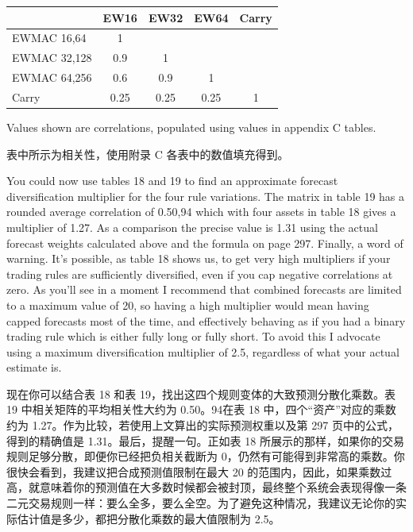 \begin{englishtableblock} \begingroup \small \centering \begin{tabular}{@{} lcccc@{}}
\toprule
& EW16 & EW32 & EW64 & Carry \\
\midrule
EWMAC 16,64 & 1 & & & \\
EWMAC 32,128 & 0.9 & 1 & & \\
EWMAC 64,256 & 0.6 & 0.9 & 1 & \\
Carry & 0.25 & 0.25 & 0.25 & 1 \\
\bottomrule
\end{tabular}
\par \endgroup \end{englishtableblock}

\begin{englishblock} Values shown are correlations, populated using values in appendix C tables. \end{englishblock}

\begin{chineseblock}表中所示为相关性，使用附录 C 各表中的数值填充得到。\end{chineseblock}

\bipairgap

\begin{englishblock} You could now use tables 18 and 19 to find an approximate forecast diversification multiplier for the four rule variations. The matrix in table 19 has a rounded average correlation of 0.50,94 which with four assets in table 18 gives a multiplier of 1.27. As a comparison the precise value is 1.31 using the actual forecast weights calculated above and the formula on page 297. Finally, a word of warning. It’s possible, as table 18 shows us, to get very high multipliers if your trading rules are sufficiently diversified, even if you cap negative correlations at zero. As you’ll see in a moment I recommend that combined forecasts are limited to a maximum value of 20, so having a high multiplier would mean having capped forecasts most of the time, and effectively behaving as if you had a binary trading rule which is either fully long or fully short. To avoid this I advocate using a maximum diversification multiplier of 2.5, regardless of what your actual estimate is. \end{englishblock}

\begin{chineseblock}现在你可以结合表 18 和表 19，找出这四个规则变体的大致预测分散化乘数。表 19 中相关矩阵的平均相关性大约为 0.50。94在表 18 中，四个“资产”对应的乘数约为 1.27。作为比较，若使用上文算出的实际预测权重以及第 297 页中的公式，得到的精确值是 1.31。最后，提醒一句。正如表 18 所展示的那样，如果你的交易规则足够分散，即便你已经把负相关截断为 0，仍然有可能得到非常高的乘数。你很快会看到，我建议把合成预测值限制在最大 20 的范围内，因此，如果乘数过高，就意味着你的预测值在大多数时候都会被封顶，最终整个系统会表现得像一条二元交易规则一样：要么全多，要么全空。为了避免这种情况，我建议无论你的实际估计值是多少，都把分散化乘数的最大值限制为 2.5。 \end{chineseblock}

